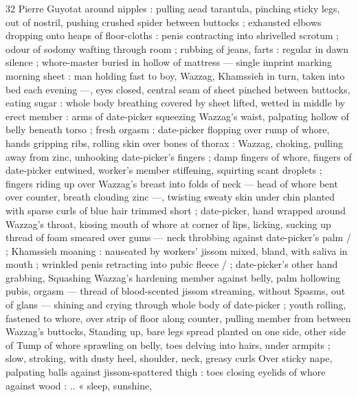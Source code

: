 32 Pierre Guyotat
around nipples : pulling aead tarantula, pinching sticky legs, out of
nostril, pushing crushed spider between buttocks ; exhausted elbows
dropping onto heaps of floor-cloths : penis contracting into
shrivelled scrotum ; odour of sodomy wafting through room ; rubbing
of jeans, farts : regular in dawn silence ; whore-master buried in
hollow of mattress — single imprint marking morning sheet : man
holding fast to boy, Wazzag, Khamssieh in turn, taken into bed each
evening —, eyes closed, central seam of sheet pinched between
buttocks, eating sugar : whole body breathing covered by sheet
lifted, wetted in middle by erect member : arms of date-picker
squeezing Wazzag's waist, palpating hollow of belly beneath torso ;
fresh orgasm : date-picker flopping over rump of whore, hands
gripping ribs, rolling skin over bones of thorax : Wazzag, choking,
pulling away from zinc, unhooking date-picker's fingers ; damp
fingers of whore, fingers of date-picker entwined, worker's member
stiffening, squirting scant droplets ; fingers riding up over Wazzag's
breast into folds of neck — head of whore bent over counter, breath
clouding zinc —, twisting sweaty skin under chin planted with sparse
curls of blue hair trimmed short ; date-picker, hand wrapped around
Wazzag's throat, kissing mouth of whore at corner of lips, licking,
sucking up thread of foam smeared over gums — neck throbbing
against date-picker's palm / ; Khamssieh moaning : nauseated by
workers’ jissom mixed, bland, with saliva in mouth ; wrinkled penis
retracting into pubic fleece / ; date-picker's other hand grabbing,
Squashing Wazzag's hardening member against belly, palm hollowing
pubis, orgasm — thread of blood-scented jissom streaming, without
Spasms, out of glans — shining and crying through whole body of
date-picker ; youth rolling, fastened to whore, over strip of floor
along counter, pulling member from between Wazzag's buttocks,
Standing up, bare legs spread planted on one side, other side of
Tump of whore sprawling on belly, toes delving into hairs, under
armpits ; slow, stroking, with dusty heel, shoulder, neck, greasy curls
Over sticky nape, palpating balls against jissom-spattered thigh :
toes closing eyelids of whore against wood : .. « sleep, sunshine,

